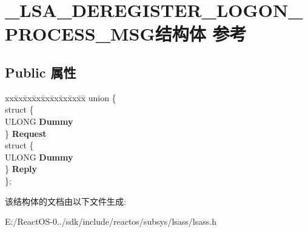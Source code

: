 \hypertarget{struct___l_s_a___d_e_r_e_g_i_s_t_e_r___l_o_g_o_n___p_r_o_c_e_s_s___m_s_g}{}\section{\+\_\+\+L\+S\+A\+\_\+\+D\+E\+R\+E\+G\+I\+S\+T\+E\+R\+\_\+\+L\+O\+G\+O\+N\+\_\+\+P\+R\+O\+C\+E\+S\+S\+\_\+\+M\+S\+G结构体 参考}
\label{struct___l_s_a___d_e_r_e_g_i_s_t_e_r___l_o_g_o_n___p_r_o_c_e_s_s___m_s_g}
\subsection*{Public 属性}
\begin{DoxyCompactItemize}
\item 
\mbox{\label{struct___l_s_a___d_e_r_e_g_i_s_t_e_r___l_o_g_o_n___p_r_o_c_e_s_s___m_s_g_a2d33bd546e7795b9684ed1d6aaec379e}} 
\begin{tabbing}
xx\=xx\=xx\=xx\=xx\=xx\=xx\=xx\=xx\=\kill
union \{\\
\>struct \{\\
\>\>ULONG {\bfseries Dummy}\\
\>\} {\bfseries Request}\\
\>struct \{\\
\>\>ULONG {\bfseries Dummy}\\
\>\} {\bfseries Reply}\\
\}; \\

\end{tabbing}\end{DoxyCompactItemize}


该结构体的文档由以下文件生成\+:\begin{DoxyCompactItemize}
\item 
E\+:/\+React\+O\+S-\/0../sdk/include/reactos/subsys/lsass/lsass.\+h\end{DoxyCompactItemize}
